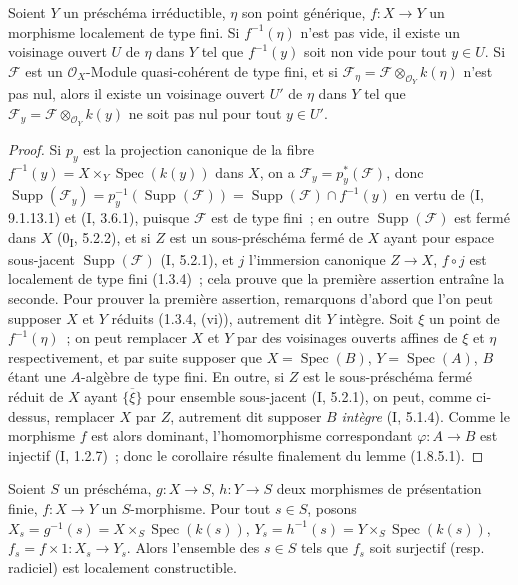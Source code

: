\begin{corollary}[1.8.6]
\label{IV.1.8.6-fr}
Soient $Y$ un préschéma irréductible, $\eta$ son point générique,
$f:X\to Y$ un morphisme localement de type fini. Si $f^{-1}(\eta)$ n'est pas
vide, il existe un voisinage ouvert $U$ de $\eta$ dans $Y$ tel que
$f^{-1}(y)$ soit non vide pour tout $y\in U$. Si $\mathscr F$ est un
$\mathcal O_X$-Module quasi-cohérent de type fini, et si
$\mathscr F_\eta=\mathscr F\otimes_{\mathcal O_Y}k(\eta)$ n'est pas nul,
alors il existe un voisinage ouvert $U'$ de $\eta$ dans $Y$ tel que
$\mathscr F_y=\mathscr F\otimes_{\mathcal O_Y}k(y)$ ne soit pas nul pour
tout $y\in U'$.
\end{corollary}

\begin{proof}
Si $p_y$ est la projection canonique de la fibre
$f^{-1}(y)=X\times_Y\operatorname{Spec}(k(y))$ dans $X$, on a
$\mathscr F_y=p_y^*(\mathscr F)$, donc
$\operatorname{Supp}(\mathscr F_y)=p_y^{-1}(\operatorname{Supp}(\mathscr F))
=\operatorname{Supp}(\mathscr F)\cap f^{-1}(y)$ en vertu de (I, 9.1.13.1) et
(I, 3.6.1), puisque $\mathscr F$ est de type fini~; en outre
$\operatorname{Supp}(\mathscr F)$ est fermé dans $X$ (0\textsubscript{I},
5.2.2), et si $Z$ est un sous-préschéma fermé de $X$ ayant pour espace
sous-jacent $\operatorname{Supp}(\mathscr F)$ (I, 5.2.1), et $j$ l'immersion
canonique $Z\to X$, $f\circ j$ est localement de type fini (1.3.4)~; cela
prouve que la première assertion entraîne la seconde. Pour prouver la
première assertion, remarquons d'abord que l'on peut supposer $X$ et $Y$
réduits (1.3.4, (vi)), autrement dit $Y$ intègre. Soit $\xi$ un point de
$f^{-1}(\eta)$~; on peut remplacer $X$ et $Y$ par des voisinages ouverts
affines de $\xi$ et $\eta$ respectivement, et par suite supposer que
$X=\operatorname{Spec}(B)$, $Y=\operatorname{Spec}(A)$, $B$ étant une
$A$-algèbre de type fini. En outre, si $Z$ est le sous-préschéma fermé réduit
de $X$ ayant $\overline{\{\xi\}}$ pour ensemble sous-jacent (I, 5.2.1), on
peut, comme ci-dessus, remplacer $X$ par $Z$, autrement dit supposer $B$
\emph{intègre} (I, 5.1.4). Comme le morphisme $f$ est alors dominant,
l'homomorphisme correspondant $\varphi:A\to B$ est injectif (I, 1.2.7)~;
donc le corollaire résulte finalement du lemme (1.8.5.1).
\end{proof}


\begin{proposition}[1.8.7]
\label{IV.1.8.7-fr}
Soient $S$ un préschéma, $g:X\to S$, $h:Y\to S$ deux morphismes de
présentation finie, $f:X\to Y$ un $S$-morphisme. Pour tout $s\in S$, posons
$X_s=g^{-1}(s)=X\times_S\operatorname{Spec}(k(s))$,
$Y_s=h^{-1}(s)=Y\times_S\operatorname{Spec}(k(s))$,
$f_s=f\times 1:X_s\to Y_s$. Alors l'ensemble des $s\in S$ tels que $f_s$
soit surjectif (resp. radiciel) est localement constructible.
\end{proposition}

